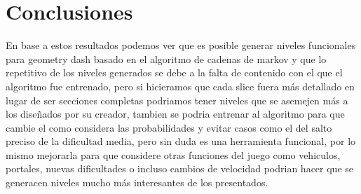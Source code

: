 \documentclass{article}
\begin{document}
\section{Conclusiones}
En base a estos resultados podemos ver que es posible generar niveles funcionales para geometry dash basado en el algoritmo de cadenas de markov y que lo repetitivo de los niveles generados se debe a la falta de contenido con el que el algoritmo fue entrenado, pero si hicieramos que cada slice fuera más detallado en lugar de ser secciones completas podriamos tener niveles que se asemejen más a los diseñados por su creador, tambien se podria entrenar al algoritmo para que cambie el como considera las probabilidades y evitar casos como el del salto preciso de la dificultad media, pero sin duda es una herramienta funcional, por lo mismo mejorarla para que considere otras funciones del juego como vehiculos, portales, nuevas dificultades o incluso cambios de velocidad podrian hacer que se generacen niveles mucho más interesantes de los presentados.
\printbibliography
\end{document}
